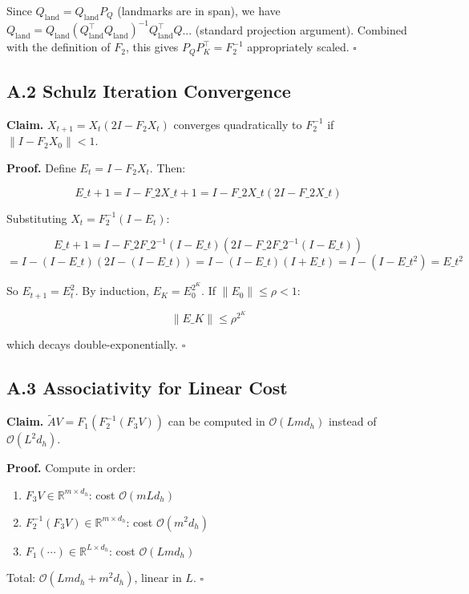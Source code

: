 Since $Q_\text{land} = Q_\text{land} P_Q$ (landmarks are in span), we have 
$Q_\text{land} = Q_\text{land} (Q_\text{land}^\top Q_\text{land})^{-1} Q_\text{land}^\top Q$... 
(standard projection argument). Combined with the definition of $F_2$, this 
gives $P_Q P_K^\top = F_2^{-1}$ appropriately scaled. $\square$

\subsection{A.2 Schulz Iteration Convergence}

\textbf{Claim.} $X_{t+1} = X_t (2I - F_2 X_t)$ converges quadratically to $F_2^{-1}$ 
if $\|I - F_2 X_0\| < 1$.

\textbf{Proof.} Define $E_t = I - F_2 X_t$. Then:

\[
E\_{t+1} = I - F\_2 X\_{t+1} = I - F\_2 X\_t (2I - F\_2 X\_t)
\]

Substituting $X_t = F_2^{-1}(I - E_t)$:

\[
E\_{t+1} = I - F\_2 F\_2^{-1}(I - E\_t) (2I - F\_2 F\_2^{-1}(I - E\_t))
\]
\[
= I - (I - E\_t)(2I - (I - E\_t)) = I - (I - E\_t)(I + E\_t) = I - (I - E\_t^2) = E\_t^2
\]

So $E_{t+1} = E_t^2$. By induction, $E_K = E_0^{2^K}$. If $\|E_0\| \le \rho < 1$:

\[
\|E\_K\| \le \rho^{2^K}
\]

which decays double-exponentially. $\square$

\subsection{A.3 Associativity for Linear Cost}

\textbf{Claim.} $\tilde{A} V = F_1 (F_2^{-1} (F_3 V))$ can be computed in 
$\mathcal{O}(L m d_h)$ instead of $\mathcal{O}(L^2 d_h)$.

\textbf{Proof.} Compute in order:

\begin{enumerate}
\item $F_3 V \in \mathbb{R}^{m \times d_h}$: cost $\mathcal{O}(m L d_h)$
\item $F_2^{-1} (F_3 V) \in \mathbb{R}^{m \times d_h}$: cost $\mathcal{O}(m^2 d_h)$
\item $F_1 (\cdots) \in \mathbb{R}^{L \times d_h}$: cost $\mathcal{O}(L m d_h)$

\end{enumerate}
Total: $\mathcal{O}(L m d_h + m^2 d_h)$, linear in $L$. $\square$

